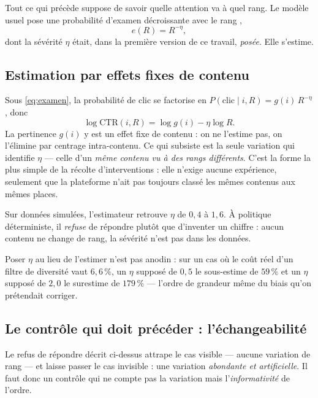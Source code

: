 \documentclass[11pt,a4paper]{article}
\begin{document}
Tout ce qui précède suppose de savoir quelle attention va à quel rang. Le modèle usuel pose
une probabilité d'examen décroissante avec le rang \citep{joachims2017},
\begin{equation}
e(R) = R^{-\eta},
\label{eq:examen}
\end{equation}
dont la sévérité $\eta$ était, dans la première version de ce travail, \emph{posée}. Elle
s'estime.

\subsection{Estimation par effets fixes de contenu}

Sous \eqref{eq:examen}, la probabilité de clic se factorise en $P(\text{clic} \mid i, R) =
g(i)\, R^{-\eta}$, donc
\begin{equation}
\log \mathrm{CTR}(i, R) = \log g(i) - \eta \log R .
\label{eq:effetsfixes}
\end{equation}
La pertinence $g(i)$ y est un effet fixe de contenu : on ne l'estime pas, on l'élimine par
centrage intra-contenu. Ce qui subsiste est la seule variation qui identifie $\eta$ --- celle
d'un \emph{même contenu vu à des rangs différents}. C'est la forme la plus simple de la
récolte d'interventions \citep{agarwal2019} : elle n'exige aucune expérience, seulement que
la plateforme n'ait pas toujours classé les mêmes contenus aux mêmes places.

Sur données simulées, l'estimateur retrouve $\eta$ de $0{,}4$ à $1{,}6$. À politique
déterministe, il \emph{refuse} de répondre plutôt que d'inventer un chiffre : aucun contenu
ne change de rang, la sévérité n'est pas dans les données.

Poser $\eta$ au lieu de l'estimer n'est pas anodin : sur un cas où le coût réel d'un filtre
de diversité vaut $6{,}6\,\%$, un $\eta$ supposé de $0{,}5$ le sous-estime de $59\,\%$ et un
$\eta$ supposé de $2{,}0$ le surestime de $179\,\%$ --- l'ordre de grandeur même du biais
qu'on prétendait corriger.

\subsection{Le contrôle qui doit précéder : l'échangeabilité}

Le refus de répondre décrit ci-dessus attrape le cas visible --- aucune variation de rang ---
et laisse passer le cas invisible : une variation \emph{abondante et artificielle}. Il faut
donc un contrôle qui ne compte pas la variation mais l'\emph{informativité} de l'ordre.
\end{document}
